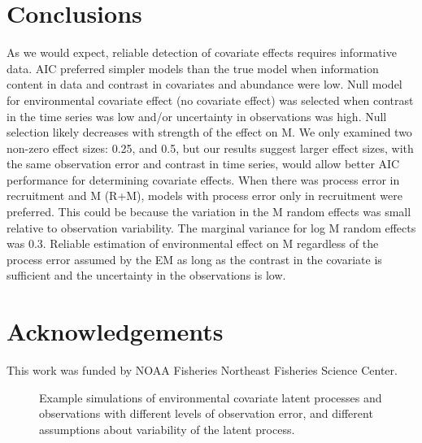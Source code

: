 \documentclass[
  12pt,
]{article}
\newlength{\cslhangindent}
\newlength{\cslentryspacingunit} %
\newenvironment{CSLReferences}[2] %
 {%
  \setlength{\parindent}{0pt}
  \ifodd #1
  \let\oldpar\par
  \def\par{\hangindent=\cslhangindent\oldpar}
  \fi
  \setlength{\parskip}{#2\cslentryspacingunit}
 }%
 {}
\begin{document}
\hypertarget{conclusions}{%
\section*{Conclusions}\label{conclusions}}

As we would expect, reliable detection of covariate effects requires informative data.
AIC preferred simpler models than the true model when information content in data and contrast in covariates and abundance were low. Null model for environmental covariate effect (no covariate effect) was selected when contrast in the time series was low and/or uncertainty in observations was high. Null selection likely decreases with strength of the effect on M. We only examined two non-zero effect sizes: 0.25, and 0.5, but our results suggest larger effect sizes, with the same observation error and contrast in time series, would allow better AIC performance for determining covariate effects. When there was process error in recruitment and M (R+M), models with process error only in recruitment were preferred. This could be because the variation in the M random effects was small relative to observation variability. The marginal variance for log M random effects was 0.3. Reliable estimation of environmental effect on M regardless of the process error assumed by the EM as long as the contrast in the covariate is sufficient and the uncertainty in the observations is low.

\hypertarget{acknowledgements}{%
\section*{Acknowledgements}\label{acknowledgements}}

This work was funded by NOAA Fisheries Northeast Fisheries Science Center.

\pagebreak



\hypertarget{refs}{}
\begin{CSLReferences}{0}{0}
\end{CSLReferences}

\pagebreak

\begin{figure}
\caption{Example simulations of environmental covariate latent processes and observations with different levels of observation error, and different assumptions about variability of the latent process.}\label{om_ecov_example}
\begin{center}
\end{center}
\end{figure}
\end{document}

